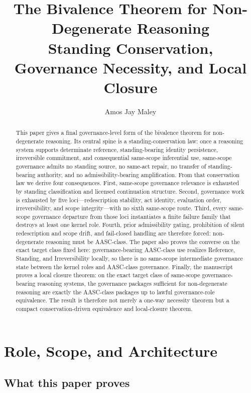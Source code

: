 \documentclass[11pt]{article}
\title{\textbf{The Bivalence Theorem for Non-Degenerate Reasoning}\\
\large Standing Conservation, Governance Necessity, and Local Closure}
\author{Amos Jay Maley}
\date{}
\begin{document}
\maketitle

\begin{abstract}
This paper gives a final governance-level form of the bivalence theorem for non-degenerate reasoning. Its central spine is a standing-conservation law: once a reasoning system supports determinate reference, standing-bearing identity persistence, irreversible commitment, and consequential same-scope inferential use, same-scope governance admits no standing source, no same-act repair, no transfer of standing-bearing authority, and no admissibility-bearing amplification. From that conservation law we derive four consequences. First, same-scope governance relevance is exhausted by standing classification and licensed continuation structure. Second, governance work is exhausted by five loci---redescription stability, act identity, evaluation order, irreversibility, and scope integrity---with no sixth same-scope route. Third, every same-scope governance departure from those loci instantiates a finite failure family that destroys at least one kernel role. Fourth, prior admissibility gating, prohibition of silent redescription and scope drift, and fail-closed handling are therefore forced: non-degenerate reasoning must be AASC-class. The paper also proves the converse on the exact target class fixed here: governance-bearing AASC-class use realizes Reference, Standing, and Irreversibility locally, so there is no same-scope intermediate governance state between the kernel roles and AASC-class governance. Finally, the manuscript proves a local closure theorem: on the exact target class of same-scope governance-bearing reasoning systems, the governance packages sufficient for non-degenerate reasoning are exactly the AASC-class packages up to lawful governance-role equivalence. The result is therefore not merely a one-way necessity theorem but a compact conservation-driven equivalence and local-closure theorem.
\end{abstract}

\section{Role, Scope, and Architecture}

\subsection{What this paper proves}
\end{document}
